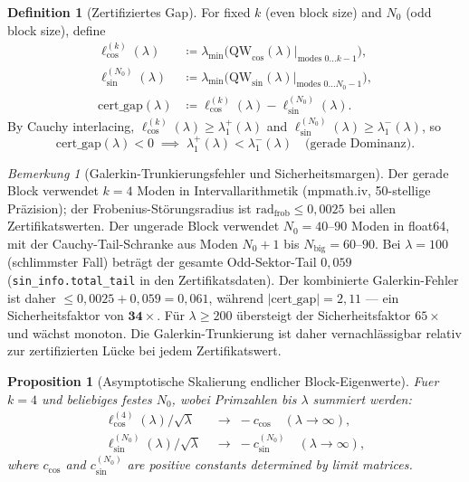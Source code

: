 \documentclass[12pt,a4paper]{article}
\newtheorem{proposition}[theorem]{Proposition}
\theoremstyle{definition}
\newtheorem{definition}[theorem]{Definition}
\theoremstyle{remark}
\newtheorem{remark}[theorem]{Bemerkung}
\begin{document}
\begin{definition}[Zertifiziertes Gap]
For fixed $k$ (even block size) and $N_0$ (odd block size), define
\begin{align*}
  \ell_{\cos}^{(k)}(\lambda) &\coloneqq \lambda_{\min}\!\bigl(\mathrm{QW}_{\cos}(\lambda)\big|_{\text{modes }0\ldots k-1}\bigr), \\
  \ell_{\sin}^{(N_0)}(\lambda) &\coloneqq \lambda_{\min}\!\bigl(\mathrm{QW}_{\sin}(\lambda)\big|_{\text{modes }0\ldots N_0-1}\bigr), \\
  \mathrm{cert\_gap}(\lambda) &\coloneqq \ell_{\cos}^{(k)}(\lambda) - \ell_{\sin}^{(N_0)}(\lambda).
\end{align*}
By Cauchy interlacing, $\ell_{\cos}^{(k)}(\lambda) \geq \lambda_1^+(\lambda)$ and $\ell_{\sin}^{(N_0)}(\lambda) \geq \lambda_1^-(\lambda)$, so
\[
  \mathrm{cert\_gap}(\lambda) < 0 \;\implies\; \lambda_1^+(\lambda) < \lambda_1^-(\lambda) \quad\text{(gerade Dominanz).}
\]
\end{definition}

\begin{remark}[Galerkin-Trunkierungsfehler und Sicherheitsmargen]
\label{rem:galerkin-safety}
Der gerade Block verwendet $k = 4$ Moden in Intervallarithmetik (mpmath.iv, 50-stellige Präzision); der Frobenius-Störungsradius ist $\mathrm{rad}_{\mathrm{frob}} \leq 0{,}0025$ bei allen Zertifikatswerten. Der ungerade Block verwendet $N_0 = 40$--$90$ Moden in float64, mit der Cauchy-Tail-Schranke aus Moden $N_0+1$ bis $N_{\mathrm{big}} = 60$--$90$. Bei $\lambda = 100$ (schlimmster Fall) beträgt der gesamte Odd-Sektor-Tail $0{,}059$ (\texttt{sin\_info.total\_tail} in den Zertifikatsdaten). Der kombinierte Galerkin-Fehler ist daher $\leq 0{,}0025 + 0{,}059 = 0{,}061$, während $|\mathrm{cert\_gap}| = 2{,}11$ --- ein Sicherheitsfaktor von $\mathbf{34\times}$. Für $\lambda \geq 200$ übersteigt der Sicherheitsfaktor $65\times$ und wächst monoton. Die Galerkin-Trunkierung ist daher vernachlässigbar relativ zur zertifizierten Lücke bei jedem Zertifikatswert.
\end{remark}

\begin{proposition}[Asymptotische Skalierung endlicher Block-Eigenwerte]
\label{prop:scaling}
Fuer $k = 4$ und beliebiges festes $N_0$, wobei Primzahlen bis $\lambda$ summiert werden:
\begin{align}
  \ell_{\cos}^{(4)}(\lambda) / \sqrt{\lambda} &\;\to\; -c_{\cos} \quad (\lambda \to \infty), \label{eq:ccos-limit} \\
  \ell_{\sin}^{(N_0)}(\lambda) / \sqrt{\lambda} &\;\to\; -c_{\sin}^{(N_0)} \quad (\lambda \to \infty), \label{eq:csin-limit}
\end{align}
where $c_{\cos}$ and $c_{\sin}^{(N_0)}$ are positive constants determined by limit matrices.
\end{proposition}
\end{document}
